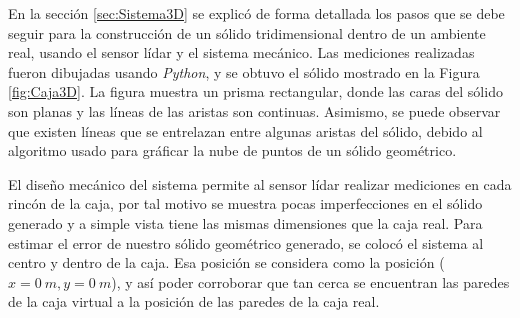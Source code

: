En la sección \ref{sec:Sistema3D} se explicó de forma detallada los pasos que 
se debe seguir para la construcción de un sólido tridimensional dentro de un 
ambiente real, usando el sensor lídar y el sistema mecánico. Las mediciones 
realizadas fueron dibujadas usando \textit{Python}, y se obtuvo el sólido 
mostrado en la Figura \ref{fig:Caja3D}. La figura muestra un prisma 
rectangular, donde las caras del sólido son planas y las líneas de las aristas 
son continuas. Asimismo, se puede observar que existen líneas que se entrelazan 
entre algunas aristas del sólido, debido al algoritmo usado para gráficar 
la nube de puntos de un sólido geométrico.

El diseño mecánico del sistema permite al sensor lídar realizar mediciones
en cada rincón de la caja, por tal motivo se muestra pocas imperfecciones en 
el sólido generado y a simple vista tiene las mismas dimensiones que la caja 
real. Para estimar el error de nuestro sólido geométrico generado, se colocó 
el sistema al centro y dentro de la caja. Esa posición se considera como 
la posición ($x = 0~m, y = 0~m$), y así poder corroborar que tan cerca se 
encuentran las paredes de la caja virtual a la posición de las paredes de la 
caja real.



